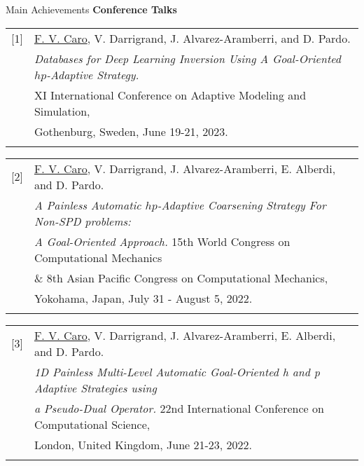 \begin{frame}{Main Achievements}
\textbf{Conference Talks}
\vspace{0.2cm}

\begin{small}
\begin{tabular}{rl}
[1]& \underline{F. V. Caro}, V. Darrigrand, J. Alvarez-Aramberri, and D. Pardo. \\
& \textit{Databases for Deep Learning Inversion Using A Goal-Oriented $hp$-Adaptive Strategy.} \\
& XI International Conference on Adaptive Modeling and Simulation, \\
& Gothenburg, Sweden, June 19-21, 2023. \\\\
\end{tabular}

\begin{tabular}{rl}
[2]& \underline{F. V. Caro}, V. Darrigrand, J. Alvarez-Aramberri, E. Alberdi, and D. Pardo. \\
& \textit{A Painless Automatic $hp$-Adaptive Coarsening Strategy For Non-SPD problems:} \\
& \textit{A Goal-Oriented Approach.} 15th World Congress on Computational Mechanics \\
& \& 8th Asian Pacific Congress on Computational Mechanics, \\
& Yokohama, Japan, July 31 - August 5, 2022. \\\\
\end{tabular}

\begin{tabular}{rl}
[3]& \underline{F. V. Caro}, V. Darrigrand, J. Alvarez-Aramberri, E. Alberdi, and D. Pardo. \\
& \textit{1D Painless Multi-Level Automatic Goal-Oriented h and p Adaptive Strategies using} \\
& \textit{a Pseudo-Dual Operator.} 22nd International Conference on Computational Science, \\
& London, United Kingdom, June 21-23, 2022. \\\\
\end{tabular}
\end{small}

\end{frame}

